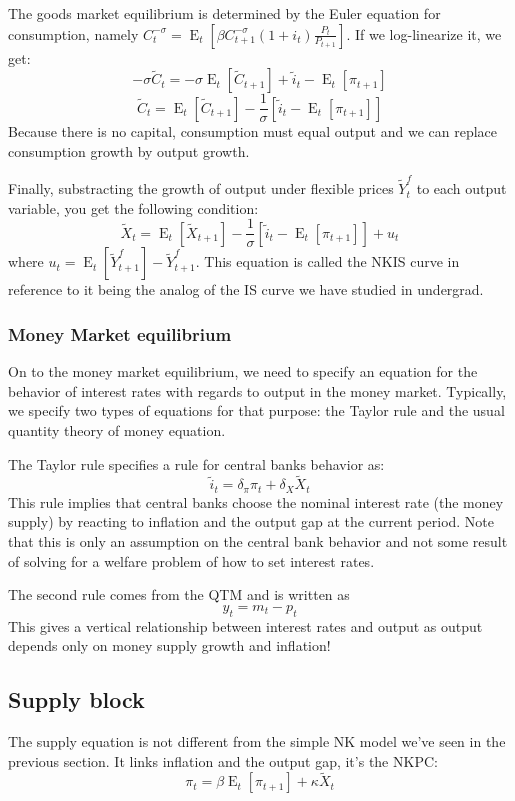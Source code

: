 \documentclass[12pt]{report}
\newcommand{\Et}[1]{\operatorname{E}_t\left[#1\right]}
\begin{document}
The goods market equilibrium is determined by the Euler equation for consumption, namely $ C_t^{-\sigma} = \Et{\beta C_{t+1}^{-\sigma} (1+i_t) \frac{P_t}{P_{t+1}}} $. If we log-linearize it, we get: $$ -\sigma \tilde C_t = -\sigma\Et{\tilde C_{t+1}} + \tilde i_t - \Et{\pi_{t+1}} $$ $$\tilde C_t = \Et{\tilde C_{t+1}} -\frac{1}{\sigma}\left[\tilde i_t - \Et{\pi_{t+1}}\right] $$ Because there is no capital, consumption must equal output and we can replace consumption growth by output growth.

Finally, substracting the growth of output under flexible prices $\tilde Y_t^f$ to each output variable, you get the following condition: $$\tilde X_t = \Et{\tilde X_{t+1}} -\frac{1}{\sigma}\left[\tilde i_t - \Et{\pi_{t+1}}\right] + u_t $$ where $u_t = \Et{\tilde Y_{t+1}^f} - \tilde Y_{t+1}^f$. This equation is called the NKIS curve in reference to it being the analog of the IS curve we have studied in undergrad.

\subsubsection{Money Market equilibrium}

On to the money market equilibrium, we need to specify an equation for the behavior of interest rates with regards to output in the money market. Typically, we specify two types of equations for that purpose: the Taylor rule and the usual quantity theory of money equation.

The Taylor rule specifies a rule for central banks behavior as: $$\tilde i_t = \delta_\pi \pi_t + \delta_X \tilde X_t $$ This rule implies that central banks choose the nominal interest rate (the money supply) by reacting to inflation and the output gap at the current period. Note that this is only an assumption on the central bank behavior and not some result of solving for a welfare problem of how to set interest rates.

The second rule comes from the QTM and is written as $$ y_t = m_t - p_t $$ This gives a vertical relationship between interest rates and output as output depends only on money supply growth and inflation!

\subsection{Supply block}

The supply equation is not different from the simple NK model we've seen in the previous section. It links inflation and the output gap, it's the NKPC: $$\pi_t = \beta\Et{\pi_{t+1}} + \kappa\tilde X_t $$
\end{document}
